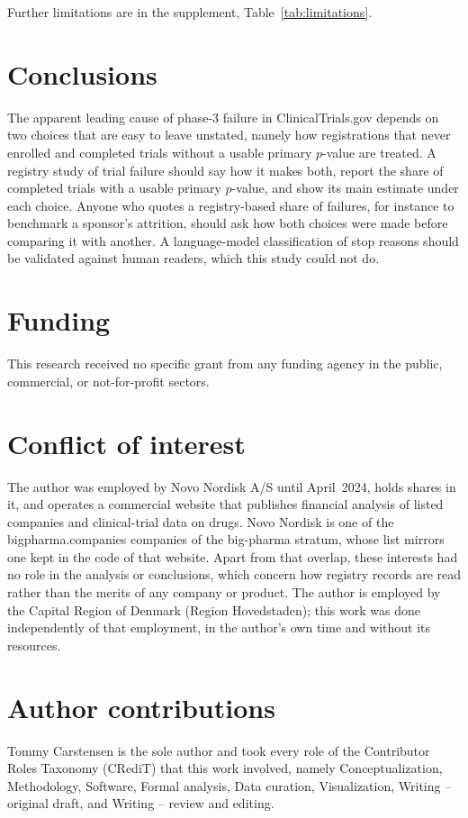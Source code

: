 \documentclass[preprint,11pt]{elsarticle}
\begin{document}
Further limitations are in the supplement, Table~\ref{tab:limitations}.

\section{Conclusions}\label{sec:conclusions}
The apparent leading cause of phase-3 failure in ClinicalTrials.gov depends on two choices that are easy to leave unstated, namely how registrations that never enrolled and completed trials without a usable primary $p$-value are treated. A registry study of trial failure should say how it makes both, report the share of completed trials with a usable primary $p$-value, and show its main estimate under each choice. Anyone who quotes a registry-based share of failures, for instance to benchmark a sponsor's attrition, should ask how both choices were made before comparing it with another. A language-model classification of stop reasons should be validated against human readers, which this study could not do.

\section*{Funding}
This research received no specific grant from any funding agency in the public, commercial, or not-for-profit sectors.

\section*{Conflict of interest}
The author was employed by Novo Nordisk A/S until April~2024, holds shares in it, and operates a commercial website that publishes financial analysis of listed companies and clinical-trial data on drugs. Novo Nordisk is one of the \num{bigpharma.companies} companies of the big-pharma stratum, whose list mirrors one kept in the code of that website. Apart from that overlap, these interests had no role in the analysis or conclusions, which concern how registry records are read rather than the merits of any company or product. The author is employed by the Capital Region of Denmark (Region Hovedstaden); this work was done independently of that employment, in the author's own time and without its resources.

\section*{Author contributions}
\noindent Tommy Carstensen is the sole author and took every role of the Contributor Roles Taxonomy (CRediT) that this work involved, namely Conceptualization, Methodology, Software, Formal analysis, Data curation, Visualization, Writing -- original draft, and Writing -- review and editing.
\end{document}
